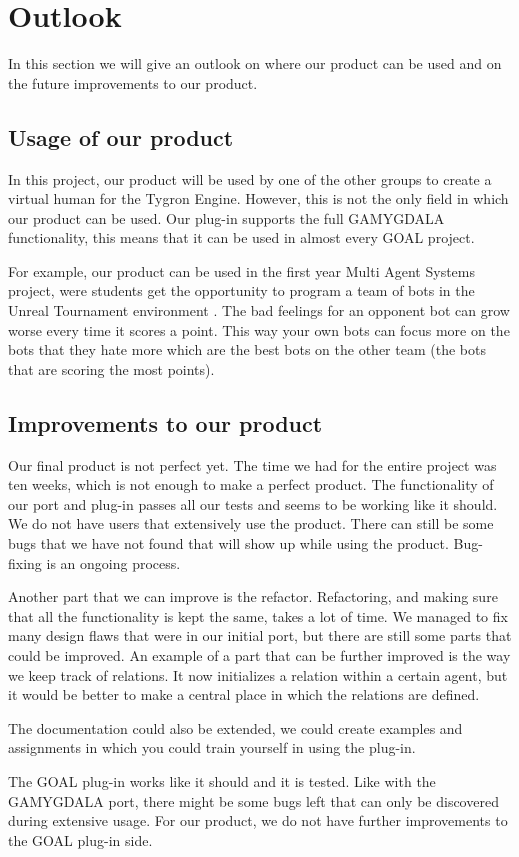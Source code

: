 \section{Outlook}
In this section we will give an outlook on where our product can be used and on the future improvements to our product.

\subsection{Usage of our product}
In this project, our product will be used by one of the other groups to create a virtual human for the Tygron Engine. However, this is not the only field in which our product can be used. Our plug-in supports the full GAMYGDALA functionality, this means that it can be used in almost every GOAL project. \par
For example, our product can be used in the first year Multi Agent Systems project, were students get the opportunity to program a team of bots in the Unreal Tournament environment \citep{UT}. The bad feelings for an opponent bot can grow worse every time it scores a point. This way your own bots can focus more on the bots that they hate more which are the best bots on the other team (the bots that are scoring the most points).

\subsection{Improvements to our product}
Our final product is not perfect yet. The time we had for the entire project was ten weeks, which is not enough to make a perfect product. The functionality of our port and plug-in passes all our tests and seems to be working like it should. We do not have users that extensively use the product. There can still be some bugs that we have not found that will show up while using the product. Bug-fixing is an ongoing process. \par
Another part that we can improve is the refactor. Refactoring, and making sure that all the functionality is kept the same, takes a lot of time. We managed to fix many design flaws that were in our initial port, but there are still some parts that could be improved. An example of a part that can be further improved is the way we keep track of relations. It now initializes a relation within a certain agent, but it would be better to make a central place in which the relations are defined. \par
The documentation could also be extended, we could create examples and assignments in which you could train yourself in using the plug-in. \par
The GOAL plug-in works like it should and it is tested. Like with the GAMYGDALA port, there might be some bugs left that can only be discovered during extensive usage. For our product, we do not have further improvements to the GOAL plug-in side.